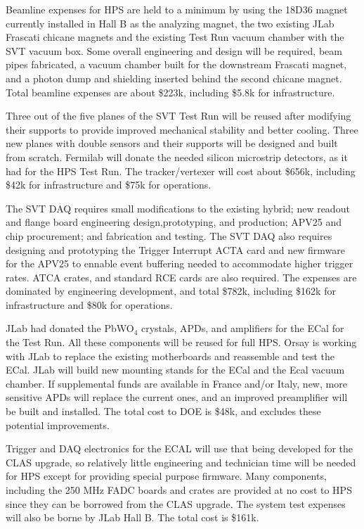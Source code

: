 Beamline expenses for HPS are held to a minimum by using the 18D36 magnet currently installed in Hall B as the analyzing magnet, the 
two existing JLab Frascati chicane magnets and the existing Test Run vacuum chamber with the SVT vacuum box.  Some overall engineering and design will be 
required, beam pipes fabricated, a vacuum chamber built for the downstream 
Frascati magnet, and a photon dump and shielding inserted behind the second chicane magnet. Total beamline expenses are about \$223k, including \$5.8k for infrastructure.

Three out of the five planes of the SVT Test Run will be reused after modifying their supports to provide improved 
mechanical stability and better cooling. Three new planes with double sensors and their supports will be designed and built from 
scratch. Fermilab will donate the needed silicon microstrip detectors, as it had for the HPS Test Run. The tracker/vertexer  will cost about \$656k, including \$42k for 
infrastructure and \$75k for operations.

The SVT DAQ requires small modifications to the  existing hybrid; new readout and flange board engineering design,prototyping, and 
production; 
APV25 and chip procurement; and  fabrication and testing. The SVT DAQ also requires designing and prototyping the Trigger Interrupt 
ACTA card and new firmware for the APV25 to ennable event buffering needed to accommodate higher trigger rates. ATCA crates, and standard 
RCE cards are also required. The expenses are dominated by engineering development, and total \$782k, including \$162k for infrastructure and \$80k for operations.  

JLab had donated the PbWO$_4$ crystals, APDs, and amplifiers for the ECal for the Test Run. All these components will be reused for full HPS. 
Orsay is working with JLab to replace the existing motherboards and reassemble and test the ECal. JLab will build new mounting stands for 
the ECal and the Ecal vacuum chamber. If supplemental funds are available in France and/or Italy, new, more sensitive APDs will replace 
the current ones, and an improved preamplifier will be built and installed. The total cost to DOE is \$48k, and excludes these potential improvements. 

Trigger and DAQ electronics for the ECAL will use that being developed for 
the CLAS upgrade, so relatively little engineering and technician time will be needed for HPS except 
for providing special purpose firmware. Many components, including the 250 MHz FADC boards and crates are provided at no cost to HPS  
since they can be borrowed from the CLAS upgrade. The system test expenses will also be borne by JLab Hall B. The total cost 
is \$161k. 

